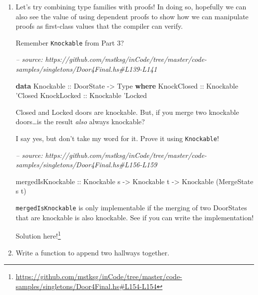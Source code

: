 \documentclass[]{article}
\newenvironment{Shaded}{}{}
\newcommand{\CommentTok}[1]{\textcolor[rgb]{0.38,0.63,0.69}{\textit{#1}}}
\newcommand{\DataTypeTok}[1]{\textcolor[rgb]{0.56,0.13,0.00}{#1}}
\newcommand{\KeywordTok}[1]{\textcolor[rgb]{0.00,0.44,0.13}{\textbf{#1}}}
\newcommand{\NormalTok}[1]{#1}
\newcommand{\OtherTok}[1]{\textcolor[rgb]{0.00,0.44,0.13}{#1}}
\renewcommand{\href}[2]{#2\footnote{\url{#1}}}
\begin{document}
\begin{enumerate}
\def\labelenumi{\arabic{enumi}.}
\item
  Let's try combining type families with proofs! In doing so, hopefully we can
  also see the value of using dependent proofs to show how we can manipulate
  proofs as first-class values that the compiler can verify.

  Remember \texttt{Knockable} from Part 3?

\begin{Shaded}
\begin{Highlighting}[]
\CommentTok{-- source: https://github.com/mstksg/inCode/tree/master/code-samples/singletons/Door4Final.hs#L139-L141}

\KeywordTok{data} \DataTypeTok{Knockable}\OtherTok{ ::} \DataTypeTok{DoorState} \OtherTok{->} \DataTypeTok{Type} \KeywordTok{where}
    \DataTypeTok{KnockClosed}\OtherTok{ ::} \DataTypeTok{Knockable}\NormalTok{ '}\DataTypeTok{Closed}
    \DataTypeTok{KnockLocked}\OtherTok{ ::} \DataTypeTok{Knockable}\NormalTok{ '}\DataTypeTok{Locked}
\end{Highlighting}
\end{Shaded}

  Closed and Locked doors are knockable. But, if you merge two knockable
  doors\ldots{}is the result \emph{also} always knockable?

  I say yes, but don't take my word for it. Prove it using \texttt{Knockable}!

\begin{Shaded}
\begin{Highlighting}[]
\CommentTok{-- source: https://github.com/mstksg/inCode/tree/master/code-samples/singletons/Door4Final.hs#L156-L159}

\NormalTok{mergedIsKnockable}
\OtherTok{    ::} \DataTypeTok{Knockable}\NormalTok{ s}
    \OtherTok{->} \DataTypeTok{Knockable}\NormalTok{ t}
    \OtherTok{->} \DataTypeTok{Knockable}\NormalTok{ (}\DataTypeTok{MergeState}\NormalTok{ s t)}
\end{Highlighting}
\end{Shaded}

  \texttt{mergedIsKnockable} is only implementable if the merging of two
  DoorStates that are knockable is also knockable. See if you can write the
  implementation!

  \href{https://github.com/mstksg/inCode/tree/master/code-samples/singletons/Door4Final.hs\#L154-L154}{Solution
  here!}
\item
  Write a function to append two hallways together.


\end{enumerate}
\end{document}
